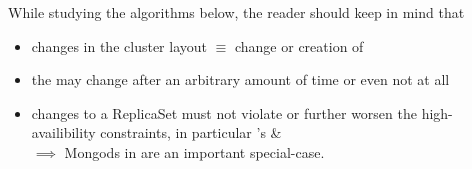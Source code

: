 While studying the algorithms below, the reader should keep in mind that
\begin{itemize}
  \item changes in the cluster layout $\equiv$ change or creation of  
  \item the  may change after an arbitrary amount of time or even not at all
  \item changes to a ReplicaSet must not violate or further worsen the high-availibility constraints,
        in particular 's  \& \\
        $\implies$ Mongods in  are an important special-case.
\end{itemize}


